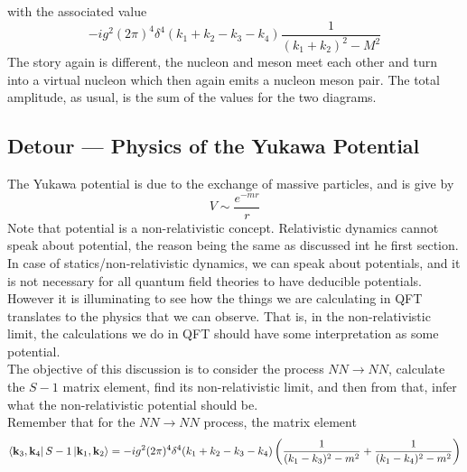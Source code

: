 \documentclass[11pt, notitlepage]{report}
\numberwithin{equation}{section}
\begin{document}
    with the associated value 
    \begin{equation*}
        -ig^2 (2\pi)^4\delta^4(k_1 + k_2 - k_3 - k_4) \frac{1}{(k_1+k_2)^2 - M^2}
    \end{equation*}
    The story again is different, the nucleon and meson meet each other and turn into a virtual nucleon which then again emits a nucleon meson pair. The total amplitude, as usual, is the sum of the values for the two diagrams.

    \subsection{Detour — Physics of the Yukawa Potential}
    The Yukawa potential is due to the exchange of massive particles, and is give by 
    \begin{equation*}
        V\sim \frac{e^{-mr}}{r}
    \end{equation*}
    Note that potential is a non-relativistic concept. Relativistic dynamics cannot speak about potential, the reason being the same as discussed int he first section. In case of statics/non-relativistic dynamics, we can speak about potentials, and it is not necessary for all quantum field theories to have deducible potentials. However it is illuminating to see how the things we are calculating in QFT translates to the physics that we can observe. That is, in the non-relativistic limit, the calculations we do in QFT should have some interpretation as some potential.\\

    The objective of this discussion is to consider the process \(NN\to NN\), calculate the \(S-1\) matrix element, find its non-relativistic limit, and then from that, infer what the non-relativistic potential should be. \\
    Remember that for the \(NN\to NN\) process, the matrix element 
    \begin{equation*}
        \bra{\textbf{k}_3, \textbf{k}_4} S-1 \ket{\textbf{k}_1, \textbf{k}_2} = -ig^2 (2\pi)^4\delta^4(k_1 +k_2 - k_3 - k_4) \left( \frac{1}{(k_1 - k_3)^2 - m^2} + \frac{1}{(k_1 - k_4)^2 - m^2 } \right)
    \end{equation*}
\end{document}
